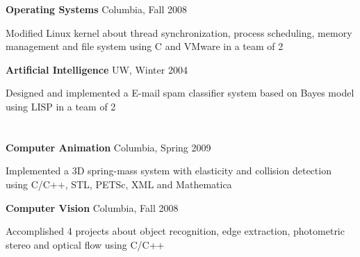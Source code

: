 \documentclass[margin,line]{resume}
\begin{document}
\begin{resume}
    \textbf{Operating Systems} \hfill Columbia, Fall 2008  \vspace{-3mm}\\\vspace{-1mm}%
      \begin{list2}
      \item Modified Linux kernel about thread synchronization, process scheduling, memory management and file system using C and VMware in a team of 2 
      \end{list2}

      

    \textbf{Artificial Intelligence} \hfill UW, Winter 2004  \vspace{-3mm}\\\vspace{-1mm}%
      \begin{list2}
      \item Designed and implemented a E-mail spam classifier system based on Bayes model using LISP in a team of 2 
      \end{list2}

      

    \section{\mysidestyle [Graphics]} 

    \textbf{Computer Animation} \hfill Columbia, Spring 2009  \vspace{-3mm}\\\vspace{-1mm}%
      \begin{list2}
      \item Implemented a 3D spring-mass system with elasticity and collision detection using C/C++, STL, PETSc, XML and Mathematica       
      \end{list2}


    \textbf{Computer Vision} \hfill Columbia, Fall 2008 \vspace{-3mm}\\\vspace{-1mm}%
      \begin{list2}
      \item Accomplished 4 projects about object recognition, edge extraction, photometric stereo and optical flow using C/C++       
      \end{list2}



\end{resume}
\end{document}
